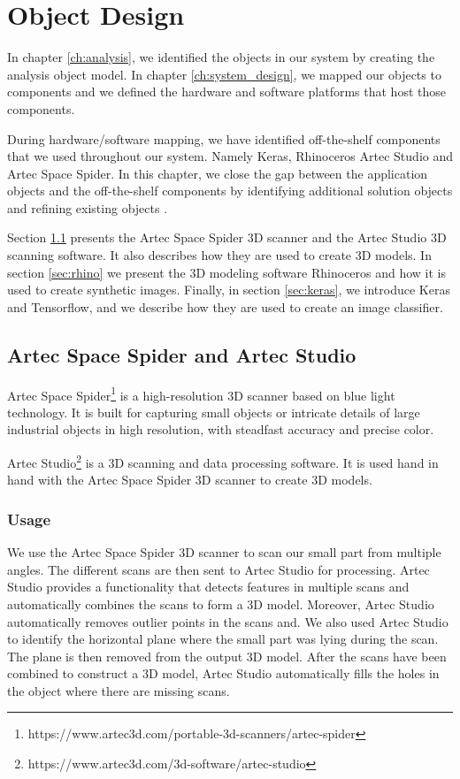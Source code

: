 \chapter{Object Design}\label{ch:object_design}
In chapter \ref{ch:analysis}, we identified the objects in our system by creating the analysis object model. In chapter \ref{ch:system_design}, we mapped our objects to components and we defined the hardware and software platforms that host those components.

During hardware/software mapping, we have identified off-the-shelf components that we used throughout our system. Namely Keras, Rhinoceros Artec Studio and Artec Space Spider. In this chapter, we close the gap between the application objects and the off-the-shelf components by identifying additional solution objects and refining existing objects \cite{bruegge2004object}.

Section \ref{sec:artec} presents the Artec Space Spider 3D scanner and the Artec Studio 3D scanning software. It also describes how they are used to create 3D models. In section \ref{sec:rhino} we present the 3D modeling software Rhinoceros and how it is used to create synthetic images. Finally, in section \ref{sec:keras}, we introduce Keras and Tensorflow, and we describe how they are used to create an image classifier.

\section{Artec Space Spider and Artec Studio}\label{sec:artec}
Artec Space Spider\footnote{https://www.artec3d.com/portable-3d-scanners/artec-spider} is a high-resolution 3D scanner based on blue light technology. It is built for capturing small objects or intricate details of large industrial objects in high resolution, with steadfast accuracy and precise color.

Artec Studio\footnote{https://www.artec3d.com/3d-software/artec-studio} is a 3D scanning and data processing software. It is used hand in hand with the Artec Space Spider 3D scanner to create 3D models.

\subsection{Usage}
We use the Artec Space Spider 3D scanner to scan our small part from multiple angles. The different scans are then sent to Artec Studio for processing. Artec Studio provides a functionality that detects features in multiple scans and automatically combines the scans to form a 3D model. Moreover, Artec Studio automatically removes outlier points in the scans and. We also used Artec Studio to identify the horizontal plane where the small part was lying during the scan. The plane is then removed from the output 3D model. After the scans have been combined to construct a 3D model, Artec Studio automatically fills the holes in the object where there are missing scans.

